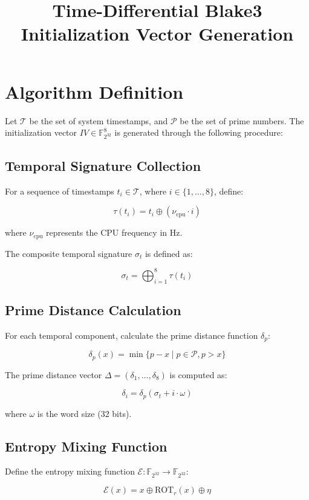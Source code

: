 \documentclass{article}
\title{Time-Differential Blake3 Initialization Vector Generation}
\author{}
\date{}
\begin{document}
\maketitle

\section{Algorithm Definition}

Let $\mathcal{T}$ be the set of system timestamps, and $\mathcal{P}$ be the set of prime numbers. The initialization vector $IV \in \mathbb{F}_{2^{32}}^8$ is generated through the following procedure:

\subsection{Temporal Signature Collection}

For a sequence of timestamps $t_i \in \mathcal{T}$, where $i \in \{1,\ldots,8\}$, define:

\[
\tau(t_i) = t_i \oplus (\nu_{\text{cpu}} \cdot i)
\]

where $\nu_{\text{cpu}}$ represents the CPU frequency in Hz.

The composite temporal signature $\sigma_t$ is defined as:

\[
\sigma_t = \bigoplus_{i=1}^8 \tau(t_i)
\]

\subsection{Prime Distance Calculation}

For each temporal component, calculate the prime distance function $\delta_p$:

\[
\delta_p(x) = \min\{p - x \mid p \in \mathcal{P}, p > x\}
\]

The prime distance vector $\Delta = (\delta_1, \ldots, \delta_8)$ is computed as:

\[
\delta_i = \delta_p(\sigma_t + i\cdot\omega)
\]

where $\omega$ is the word size (32 bits).

\subsection{Entropy Mixing Function}

Define the entropy mixing function $\mathcal{E}: \mathbb{F}_{2^{32}} \rightarrow \mathbb{F}_{2^{32}}$:

\[
\mathcal{E}(x) = x \oplus \text{ROT}_r(x) \oplus \eta
\]
\end{document}
